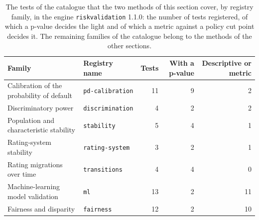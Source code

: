 \begin{table}[htbp]
\centering
\setlength{\tabcolsep}{3pt}
\footnotesize
\caption{The tests of the catalogue that the two methods of this section cover, by registry family, in the engine \texttt{riskvalidation} 1.1.0: the number of tests registered, of which a p-value decides the light and of which a metric against a policy cut point decides it. The remaining families of the catalogue belong to the methods of the other sections.}
\label{tab:vt-catalogue}
\begin{tabular}{llrrr}
\toprule
Family & Registry name & Tests & With a p-value & Descriptive or metric \\
\midrule
Calibration of the probability of default & \nolinkurl{pd-calibration} & 11 & 9 & 2 \\
Discriminatory power & \nolinkurl{discrimination} & 4 & 2 & 2 \\
Population and characteristic stability & \nolinkurl{stability} & 5 & 4 & 1 \\
Rating-system stability & \nolinkurl{rating-system} & 3 & 2 & 1 \\
Rating migrations over time & \nolinkurl{transitions} & 4 & 4 & 0 \\
Machine-learning model validation & \nolinkurl{ml} & 13 & 2 & 11 \\
Fairness and disparity & \nolinkurl{fairness} & 12 & 2 & 10 \\
\bottomrule
\end{tabular}
\end{table}
